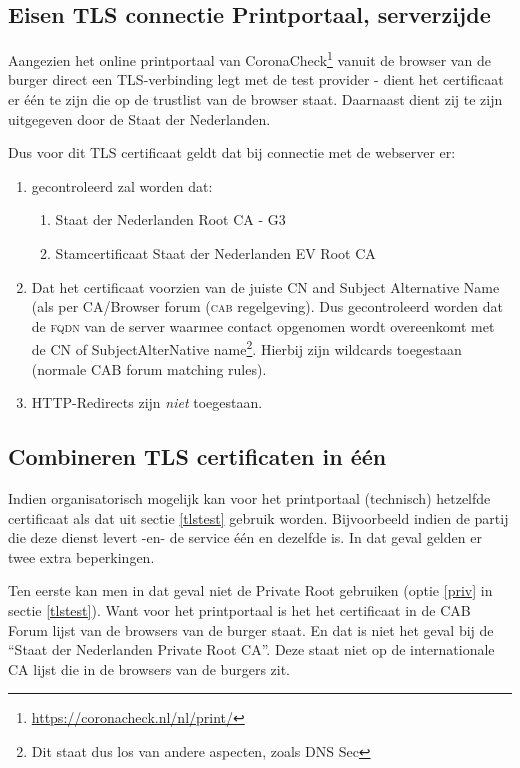 \documentclass[11.0pt,twoside,openright]{report}
\begin{document}
\subsection{Eisen TLS connectie Printportaal, serverzijde}

Aangezien het online printportaal van CoronaCheck\footnote{\url{https://coronacheck.nl/nl/print/}} vanuit de browser van de burger direct een TLS-verbinding legt met de test provider - dient het certificaat er één te zijn die op de trustlist van de browser staat. Daarnaast dient zij te zijn uitgegeven door de Staat der Nederlanden.

Dus voor dit TLS certificaat geldt dat bij connectie met de webserver er:

\begin{enumerate}
\item gecontroleerd zal worden dat: 
\begin{enumerate}
\item Staat der Nederlanden Root CA - G3
\item Stamcertificaat Staat der Nederlanden EV Root CA 
\end{enumerate}
\item Dat het certificaat voorzien van de juiste CN and Subject Alternative Name (als per CA/Browser forum (\textsc{cab} regelgeving). Dus gecontroleerd worden dat de \textsc{fqdn} van de server waarmee contact opgenomen wordt overeenkomt met de CN of SubjectAlterNative name\footnote{Dit staat dus los van andere aspecten, zoals DNS Sec}. Hierbij zijn wildcards toegestaan (normale CAB forum matching rules).
\item HTTP-Redirects zijn \emph{niet} toegestaan.
\end{enumerate}

\subsection{Combineren TLS certificaten in één}
\label{note}

Indien organisatorisch mogelijk kan voor het printportaal (technisch) hetzelfde certificaat als dat uit sectie \ref{tlstest} gebruik worden. Bijvoorbeeld indien de partij die deze dienst levert -en- de service één en dezelfde is. In dat geval gelden er twee extra beperkingen. 

Ten eerste kan men in dat geval niet de Private Root gebruiken (optie \ref{priv} in sectie \ref{tlstest}). Want voor het printportaal is het het certificaat in de CAB Forum lijst van de browsers van de burger staat. En dat is niet het geval bij de ``Staat der Nederlanden Private Root CA''. Deze staat niet op de internationale CA lijst die in de browsers van de burgers zit. 
\end{document}
